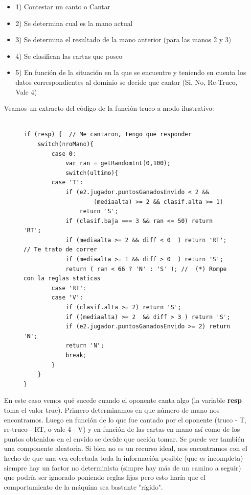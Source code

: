 \documentclass[12pt,a4paper]{article}
\begin{document}
\begin{itemize}
\item 1) Contestar un canto o Cantar
\item 2) Se determina cual es la mano actual
\item 3) Se determina el resultado de la mano anterior (para las manos 2 y 3)
\item 4) Se clasifican las cartas que poseo
\item 5) En funci\'on de la situaci\'on en la que se encuentre y teniendo en cuenta los datos correspondientes al dominio
	   se decide que cantar (Si, No, Re-Truco, Vale 4)
\end{itemize}

Veamos un extracto del c\'odigo de la funci\'on truco a modo ilustrativo:
\begin{figure}[h]
\lstset{language=java,caption=Extracto de la funci\'on truco,label=lst:nicecode}
\begin{lstlisting}

if (resp) {  // Me cantaron, tengo que responder
	switch(nroMano){
		case 0:
			var ran = getRandomInt(0,100);
			switch(ultimo){
		case 'T':
			if (e2.jugador.puntosGanadosEnvido < 2 && 
					(mediaalta) >= 2 && clasif.alta >= 1)
				return 'S';
			if (clasif.baja === 3 && ran <= 50) return 'RT'; 
			if (mediaalta >= 2 && diff < 0  ) return 'RT';  // Te trato de correr
			if (mediaalta >= 1 && diff > 0  ) return 'S';
			return ( ran < 66 ? 'N' : 'S' ); //  (*) Rompe con la reglas staticas
		case 'RT':
		case 'V':
			if (clasif.alta >= 2) return 'S';
			if ((mediaalta) >= 2  && diff > 3 ) return 'S';
			if (e2.jugador.puntosGanadosEnvido >= 2) return 'N';
			return 'N';
			break;
		}
	}
}
\end{lstlisting}
\end{figure}


\noindent En este caso vemos qu\'e sucede cuando el oponente canta algo (la variable \textbf{resp} toma el valor true). Primero determinamos
en que n\'umero de mano nos encontramos. Luego en funci\'on de lo que fue cantado por el oponente (truco - T, re-truco - RT, o vale 4 - V)
y en funci\'on de las cartas en mano as\'i como de los puntos obtenidos en el envido se decide que acci\'on tomar. Se puede ver tambi\'en
una componente aleatoria. Si bien no es un recurso ideal, nos encontramos con el hecho de que una vez colectada toda la informaci\'on posible
(que es incompleta) siempre hay un factor no determinista (simpre hay m\'as de un camino a seguir)
que podr\'ia ser ignorado poniendo reglas fijas pero esto har\'ia que el comportamiento de la m\'aquina sea bastante "r\'igido".
\end{document}
